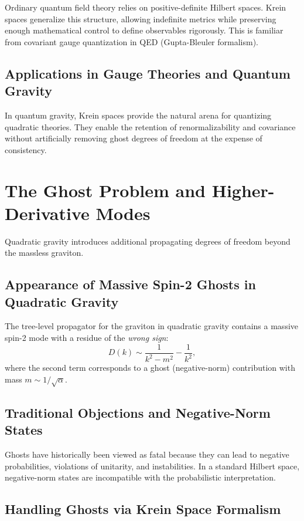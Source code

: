 \documentclass{article}
\begin{document}
Ordinary quantum field theory relies on positive-definite Hilbert spaces. Krein spaces generalize this structure, allowing indefinite metrics while preserving enough mathematical control to define observables rigorously. This is familiar from covariant gauge quantization in QED (Gupta-Bleuler formalism).

\subsection{Applications in Gauge Theories and Quantum Gravity}

In quantum gravity, Krein spaces provide the natural arena for quantizing quadratic theories. They enable the retention of renormalizability and covariance without artificially removing ghost degrees of freedom at the expense of consistency.

\section{The Ghost Problem and Higher-Derivative Modes}
\label{sec:ghosts}

Quadratic gravity introduces additional propagating degrees of freedom beyond the massless graviton.

\subsection{Appearance of Massive Spin-2 Ghosts in Quadratic Gravity}

The tree-level propagator for the graviton in quadratic gravity contains a massive spin-2 mode with a residue of the \emph{wrong sign}:
\[
D(k) \sim \frac{1}{k^2 - m^2} - \frac{1}{k^2},
\]
where the second term corresponds to a ghost (negative-norm) contribution with mass $m \sim 1/\sqrt{\alpha}$.

\subsection{Traditional Objections and Negative-Norm States}

Ghosts have historically been viewed as fatal because they can lead to negative probabilities, violations of unitarity, and instabilities. In a standard Hilbert space, negative-norm states are incompatible with the probabilistic interpretation.

\subsection{Handling Ghosts via Krein Space Formalism}
\end{document}
